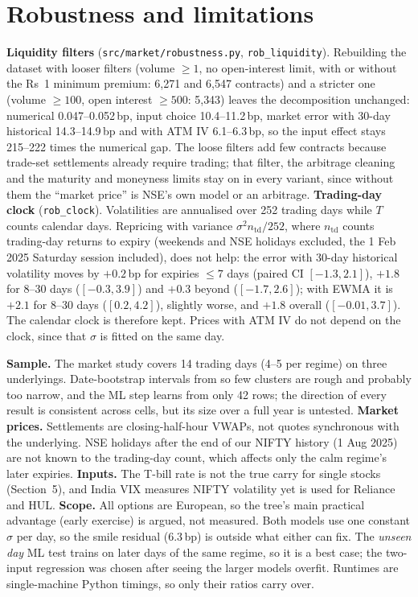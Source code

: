 \documentclass[10pt,a4paper]{article}
\newcommand{\code}[1]{\texttt{\small #1}}
\begin{document}
\section{Robustness and limitations}
\textbf{Liquidity filters} (\code{src/market/robustness.py}, \code{rob\_liquidity}). Rebuilding the dataset with
looser filters (volume $\ge1$, no open-interest limit, with or without the Rs~1 minimum premium: 6{,}271 and
6{,}547 contracts) and a stricter one (volume $\ge100$, open interest $\ge500$: 5{,}343) leaves the decomposition
unchanged: numerical 0.047--0.052\,bp, input choice 10.4--11.2\,bp, market error with 30-day historical
14.3--14.9\,bp and with ATM IV 6.1--6.3\,bp, so the input effect stays 215--222 times the numerical gap. The loose
filters add few contracts because trade-set settlements already require trading; that filter, the arbitrage
cleaning and the maturity and moneyness limits stay on in every variant, since without them the ``market price''
is NSE's own model or an arbitrage.
\textbf{Trading-day clock} (\code{rob\_clock}). Volatilities are annualised over 252 trading days while $T$ counts
calendar days. Repricing with variance $\sigma^2 n_{\text{td}}/252$, where $n_{\text{td}}$ counts trading-day returns
to expiry (weekends and NSE holidays excluded, the 1 Feb 2025 Saturday session included), does not help: the error
with 30-day historical volatility moves by $+0.2$\,bp for expiries $\le7$ days (paired CI $[-1.3,2.1]$), $+1.8$ for
8--30 days ($[-0.3,3.9]$) and $+0.3$ beyond ($[-1.7,2.6]$); with EWMA it is $+2.1$ for 8--30 days ($[0.2,4.2]$),
slightly worse, and $+1.8$ overall ($[-0.01,3.7]$). The calendar clock is therefore kept.
Prices with ATM IV do not depend on the clock, since that $\sigma$ is fitted on the same day.

\textbf{Sample.} The market study covers 14 trading days (4--5 per regime) on three underlyings. Date-bootstrap
intervals from so few clusters are rough and probably too narrow, and the ML step learns from only 42 rows; the
direction of every result is consistent across cells, but its size over a full year is untested.
\textbf{Market prices.} Settlements are closing-half-hour VWAPs, not quotes synchronous with the underlying. NSE
holidays after the end of our NIFTY history (1 Aug 2025) are not known to the trading-day count, which affects only
the calm regime's later expiries.
\textbf{Inputs.} The T-bill rate is not the true carry for single stocks (Section~5), and India VIX measures NIFTY
volatility yet is used for Reliance and HUL.
\textbf{Scope.} All options are European, so the tree's main practical advantage (early exercise) is argued, not
measured. Both models use one constant $\sigma$ per day, so the smile residual (6.3\,bp) is outside what either can
fix. The \emph{unseen day} ML test trains on later days of the same regime, so it is a best case; the two-input
regression was chosen after seeing the larger models overfit. Runtimes are single-machine Python timings, so only
their ratios carry over.
\end{document}
